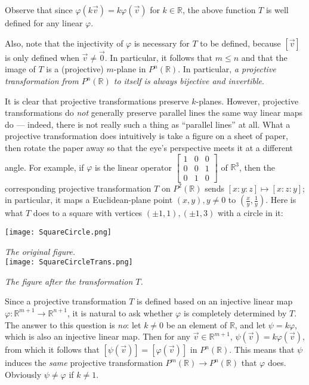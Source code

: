 \documentclass[leqno]{book}
\begin{document}
\noindent Observe that since $\varphi(k\vec v)=k\varphi(\vec v)$ for $k\in\mathbb R$, the above function $T$ is well defined for any linear $\varphi$.

Also, note that the injectivity of $\varphi$ is necessary for $T$ to be defined, because $[\vec v]$ is only defined when $\vec v\ne\vec 0$.  In particular, it follows that $m\leqslant n$ and that the image of $T$ is a (projective) $m$-plane in $P^n(\mathbb R)$.  In particular, \emph{a projective transformation from $P^n(\mathbb R)$ to itself is always bijective and invertible}.

It is clear that projective transformations preserve $k$-planes.  However, projective transformations do \emph{not} generally preserve parallel lines the same way linear maps do \---- indeed, there is not really such a thing as ``parallel lines'' at all.  What a projective transformation does intuitively is take a figure on a sheet of paper, then rotate the paper away so that the eye's perspective meets it at a different angle.  For example, if $\varphi$ is the linear operator $\begin{bmatrix}1&0&0\\0&0&1\\0&1&0\end{bmatrix}$ of $\mathbb R^3$, then the corresponding projective transformation $T$ on $P^2(\mathbb R)$ sends $[x:y:z]\mapsto[x:z:y]$; in particular, it maps a Euclidean-plane point $(x,y),y\ne 0$ to $\left(\frac xy,\frac 1y\right)$.  Here is what $T$ does to a square with vertices $(\pm 1,1),(\pm 1,3)$ with a circle in it:
\begin{multicols}{2}
\texttt{[image: SquareCircle.png]}

\emph{The original figure.}\\
\texttt{[image: SquareCircleTrans.png]}

\noindent\emph{The figure after the transformation $T$.}
\end{multicols}
\noindent Since a projective transformation $T$ is defined based on an injective linear map $\varphi:\mathbb R^{m+1}\to\mathbb R^{n+1}$, it is natural to ask whether $\varphi$ is completely determined by $T$.  The answer to this question is \emph{no}: let $k\ne 0$ be an element of $\mathbb R$, and let $\psi=k\varphi$, which is also an injective linear map.  Then for any $\vec v\in\mathbb R^{m+1}$, $\psi(\vec v)=k\varphi(\vec v)$, from which it follows that $[\psi(\vec v)]=[\varphi(\vec v)]$ in $P^n(\mathbb R)$.  This means that $\psi$ induces the \emph{same} projective transformation $P^m(\mathbb R)\to P^n(\mathbb R)$ that $\varphi$ does.  Obviously $\psi\ne\varphi$ if $k\ne 1$.
\end{document}
